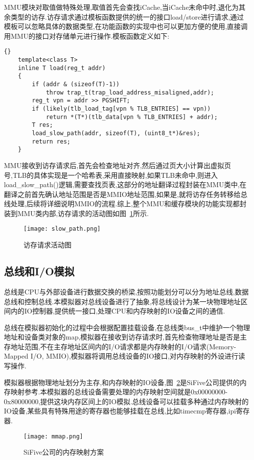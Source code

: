 MMU模块对取值做特殊处理,取值首先会查找iCache,当iCache未命中时,退化为其余类型的访存.访存请求通过模板函数提供的统一的接口load/store进行请求,通过模板可以忽略具体的数据类型,在功能函数的实现中也可以更加方便的使用,直接调用MMU的接口对存储单元进行操作.模板函数定义如下:
\begin{lstlisting}{}
    template<class T>
    inline T load(reg_t addr)
    {
        if (addr & (sizeof(T)-1))
            throw trap_t(trap_load_address_misaligned,addr);
        reg_t vpn = addr >> PGSHIFT;
        if (likely(tlb_load_tag[vpn % TLB_ENTRIES] == vpn))
            return *(T*)(tlb_data[vpn % TLB_ENTRIES] + addr);
        T res;
        load_slow_path(addr, sizeof(T), (uint8_t*)&res);
        return res;
    }    
\end{lstlisting}


MMU接收到访存请求后,首先会检查地址对齐,然后通过页大小计算出虚拟页号,TLB的具体实现是一个哈希表,采用直接映射,如果TLB未命中,则进入load\_slow\_path()逻辑,需要查找页表,这部分的地址翻译过程封装在MMU类中,在翻译之前首先确认地址范围是否是MMIO地址范围,如果是,就将访存任务转移给总线处理,后续将详细说明MMIO的流程.综上,整个MMU和缓存模块的功能实现都封装到MMU类内部,访存请求的活动图如图~\ref{fig:slow_path}所示.
\begin{figure}[H]
    \centering
    \texttt{[image: slow\_path.png]}
    \caption{访存请求活动图}
    \label{fig:slow_path}
\end{figure}

\subsection{总线和I/O模拟}
总线是CPU与外部设备进行数据交换的桥梁,按照功能划分可以分为地址总线,数据总线和控制总线.本模拟器对总线设备进行了抽象,将总线设计为某一块物理地址区间内的IO控制器,提供统一接口,处理CPU和内存映射的IO设备之间的通信.


总线在模拟器初始化的过程中会根据配置挂载设备,在总线类bus\_t中维护一个物理地址和设备类对象的map,模拟器在接收到访存请求时,首先检查物理地址是否是主存地址范围,不在主存地址区间内的I/O请求都是内存映射的I/O请求(Memory-Mapped I/O, MMIO),模拟器将调用总线设备的IO接口,对内存映射的外设进行读写操作.

模拟器根据物理地址划分为主存,和内存映射的IO设备,图~\ref{fig:mmap}是SiFive公司提供的内存映射参考.本模拟器的总线设备需要处理的内存映射空间就是0x00000000-0x80000000,提供这块内存区间上的IO模拟.总线设备可以挂载多种通过内存映射的IO设备,某些具有特殊用途的寄存器也能够挂载在总线,比如timecmp寄存器,ipi寄存器.
\begin{figure}[H]
    \centering
    \texttt{[image: mmap.png]}
    \caption{SiFive公司的内存映射方案}
    \label{fig:mmap}
\end{figure}


